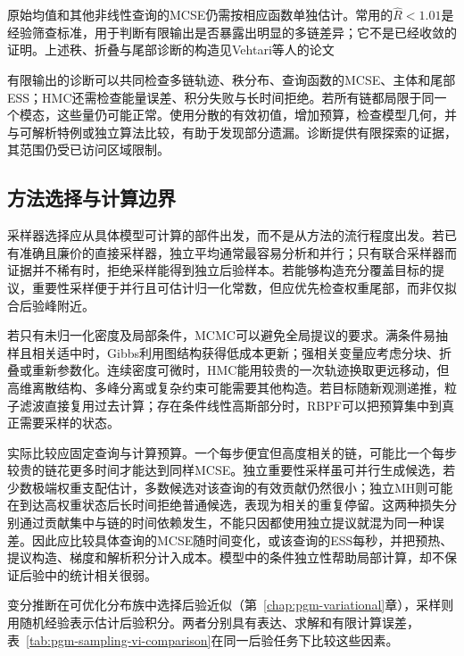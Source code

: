原始均值和其他非线性查询的MCSE仍需按相应函数单独估计。常用的$\widehat R<1.01$是经验筛查标准，用于判断有限输出是否暴露出明显的多链差异；它不是已经收敛的证明。上述秩、折叠与尾部诊断的构造见Vehtari等人的论文

有限输出的诊断可以共同检查多链轨迹、秩分布、查询函数的MCSE、主体和尾部ESS；HMC还需检查能量误差、积分失败与长时间拒绝。若所有链都局限于同一个模态，这些量仍可能正常。使用分散的有效初值，增加预算，检查模型几何，并与可解析特例或独立算法比较，有助于发现部分遗漏。诊断提供有限探索的证据，其范围仍受已访问区域限制。

\subsection{方法选择与计算边界}
\label{sec:pgm-sampling-choice}

采样器选择应从具体模型可计算的部件出发，而不是从方法的流行程度出发。若已有准确且廉价的直接采样器，独立平均通常最容易分析和并行；只有联合采样器而证据并不稀有时，拒绝采样能得到独立后验样本。若能够构造充分覆盖目标的提议，重要性采样便于并行且可估计归一化常数，但应优先检查权重尾部，而非仅拟合后验峰附近。

若只有未归一化密度及局部条件，MCMC可以避免全局提议的要求。满条件易抽样且相关适中时，Gibbs利用图结构获得低成本更新；强相关变量应考虑分块、折叠或重新参数化。连续密度可微时，HMC能用较贵的一次轨迹换取更远移动，但高维离散结构、多峰分离或复杂约束可能需要其他构造。若目标随新观测递推，粒子滤波直接复用过去计算；存在条件线性高斯部分时，RBPF可以把预算集中到真正需要采样的状态。

实际比较应固定查询与计算预算。一个每步便宜但高度相关的链，可能比一个每步较贵的链花更多时间才能达到同样MCSE。独立重要性采样虽可并行生成候选，若少数极端权重支配估计，多数候选对该查询的有效贡献仍然很小；独立MH则可能在到达高权重状态后长时间拒绝普通候选，表现为相关的重复停留。这两种损失分别通过贡献集中与链的时间依赖发生，不能只因都使用独立提议就混为同一种误差。因此应比较具体查询的MCSE随时间变化，或该查询的ESS每秒，并把预热、提议构造、梯度和解析积分计入成本。模型中的条件独立性帮助局部计算，却不保证后验中的统计相关很弱。

变分推断在可优化分布族中选择后验近似（第~\ref{chap:pgm-variational}章），采样则用随机经验表示估计后验积分。两者分别具有表达、求解和有限计算误差，表~\ref{tab:pgm-sampling-vi-comparison}在同一后验任务下比较这些因素。


